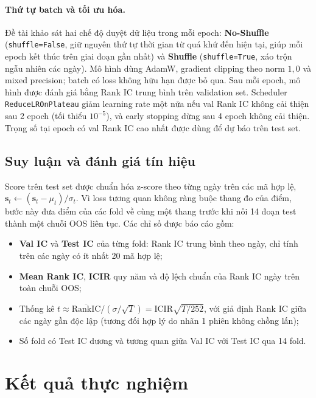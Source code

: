 \documentclass[a4paper,12pt]{article}
\begin{document}
\paragraph{Thứ tự batch và tối ưu hóa.} Đề tài khảo sát hai chế độ duyệt dữ liệu trong mỗi epoch: \textbf{No-Shuffle} (\texttt{shuffle=False}, giữ nguyên thứ tự thời gian từ quá khứ đến hiện tại, giúp mỗi epoch kết thúc trên giai đoạn gần nhất) và \textbf{Shuffle} (\texttt{shuffle=True}, xáo trộn ngẫu nhiên các ngày). Mô hình dùng AdamW, gradient clipping theo norm $1{,}0$ và mixed precision; batch có loss không hữu hạn được bỏ qua. Sau mỗi epoch, mô hình được đánh giá bằng Rank IC trung bình trên validation set. Scheduler \texttt{ReduceLROnPlateau} giảm learning rate một nửa nếu val Rank IC không cải thiện sau 2 epoch (tối thiểu $10^{-5}$), và early stopping dừng sau 4 epoch không cải thiện. Trọng số tại epoch có val Rank IC cao nhất được dùng để dự báo trên test set.

\subsection{Suy luận và đánh giá tín hiệu}
Score trên test set được chuẩn hóa z-score theo từng ngày trên các mã hợp lệ, $\mathbf{s}_t\leftarrow(\mathbf{s}_t-\mu_t)/\sigma_t$. Vì loss tương quan không ràng buộc thang đo của điểm, bước này đưa điểm của các fold về cùng một thang trước khi nối 14 đoạn test thành một chuỗi OOS liên tục. Các chỉ số được báo cáo gồm:
\begin{itemize}
    \item \textbf{Val IC} và \textbf{Test IC} của từng fold: Rank IC trung bình theo ngày, chỉ tính trên các ngày có ít nhất 20 mã hợp lệ;
    \item \textbf{Mean Rank IC}, \textbf{ICIR} quy năm và độ lệch chuẩn của Rank IC ngày trên toàn chuỗi OOS;
    \item Thống kê $t \approx \overline{\mathrm{RankIC}}/(\sigma/\sqrt{T}) = \mathrm{ICIR}\sqrt{T/252}$, với giả định Rank IC giữa các ngày gần độc lập (tương đối hợp lý do nhãn 1 phiên không chồng lấn);
    \item Số fold có Test IC dương và tương quan giữa Val IC với Test IC qua 14 fold.
\end{itemize}

\newpage
\section{Kết quả thực nghiệm}\label{sec:eval}
\end{document}
